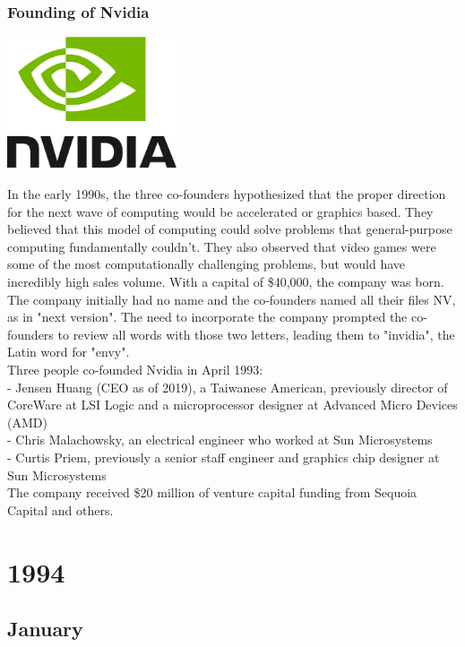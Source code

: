 \documentclass[11pt]{report}
\begin{document}
\subsection{Founding of Nvidia}
\vspace{2mm}\begin{center}\includegraphics[width=5cm]{./img/nvidiaLogo.jpg}\end{center}
In the early 1990s, the three co-founders hypothesized that the proper direction for the next wave of computing would be accelerated or graphics based. They believed that this model of computing could solve problems that general-purpose computing fundamentally couldn't. They also observed that video games were some of the most computationally challenging problems, but would have incredibly high sales volume. With a capital of \$40,000, the company was born. The company initially had no name and the co-founders named all their files NV, as in "next version". The need to incorporate the company prompted the co-founders to review all words with those two letters, leading them to "invidia", the Latin word for "envy".\\
\indent Three people co-founded Nvidia in April 1993:\\
- Jensen Huang (CEO as of 2019), a Taiwanese American, previously director of CoreWare at LSI Logic and a microprocessor designer at Advanced Micro Devices (AMD)\\
- Chris Malachowsky, an electrical engineer who worked at Sun Microsystems\\
- Curtis Priem, previously a senior staff engineer and graphics chip designer at Sun Microsystems\\
The company received \$20 million of venture capital funding from Sequoia Capital and others.

\chapter{1994}
\section{January}
\end{document}

